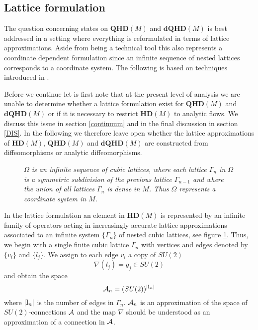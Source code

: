 \documentclass[12pt]{article}
\def\G{\Gamma}
\def\OO{\Omega}
\def\ca{{\cal A}}
\begin{document}
\subsection{Lattice formulation}

The question concerning states on $\mathbf{QHD}(M)$ and $\mathbf{dQHD}(M)$ is best addressed in a setting where everything is reformulated in terms of lattice approximations. Aside from being a technical tool this also represents a coordinate dependent formulation since an infinite sequence of nested lattices corresponds to a coordinate system. The following is based on techniques introduced in \cite{Aastrup:2012vq}. 

Before we continue let is first note that at the present level of analysis we are unable to determine whether a lattice formulation exist for $\mathbf{QHD}(M)$ and $\mathbf{dQHD}(M)$ or if it is necessary to restrict $\mathbf{HD}(M)$ to analytic flows. We discuss this issue in section \ref{continuum} and in the final discussion in section \ref{DIS}. In the following we therefore leave open whether the lattice approximations of $\mathbf{HD}(M)$, $\mathbf{QHD}(M)$ and $\mathbf{dQHD}(M)$ are constructed from diffeomorphisms or analytic diffeomorphisms.    \\



\begin{figure}[t]
\begin{center}
\resizebox{!}{2.5cm}{
 }
\end{center}
\caption{\it $\OO$ is an infinite sequence of cubic lattices, where each lattice $\G_n$ in $\OO$ is a symmetric subdivision of the previous lattice $\G_{n-1}$ and where the union of all lattices $\G_n$ is dense in $M$. Thus $\OO$ represents a coordinate system in $M$.}
 \label{ronnie}
\end{figure}




In the lattice formulation an element in $\mathbf{HD}(M)$ is represented by an infinite family of operators acting in increasingly accurate lattice approximations associated to an infinite system $\{\G_n\}$ of nested cubic lattices, see figure \ref{ronnie}. 
Thus, we begin with a single finite cubic lattice $\G_n$ with vertices and edges denoted by $\{v_i\}$ and $\{l_j\}$. We assign to each edge $v_i$ a copy of $SU(2)$ 
\begin{equation}
\nabla(l_j) = g_j\in SU(2)
\label{MAAP}
\end{equation}
and obtain the space 
$$\ca_{n}= (SU(2))^{\vert{\bf l}_n\vert}$$
where $\vert{\bf l}_n\vert$ is the number of edges in $\G_n$. $\ca_{n}$ is an approximation of the space of $SU(2)$-connections $\ca$ and the map $\nabla$ should be understood as an approximation of a connection in $\ca$. 
\end{document}
